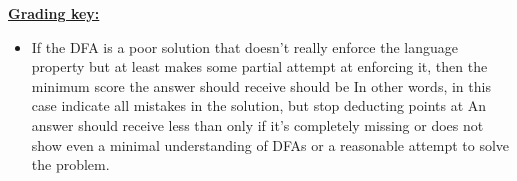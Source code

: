 \documentclass[11pt,fleqn]{article}
\begin{document}
\begin{enumerate}
\begin{info}{\textbf{\underline{Grading key:}}}
\begin{itemize}

              \item If the DFA is a poor solution that doesn't really
                    enforce the language property but at least makes some
                    partial attempt at enforcing it, then the
                    minimum score the answer should receive should be
                     In other words, in this case indicate all
                    mistakes in the solution, but stop deducting points at
                     An answer should receive less than 
                    only if it's completely missing or does not show even a
                    minimal understanding of DFAs or a reasonable attempt to
                    solve the problem.

            \end{itemize}


\end{info}
\end{enumerate}
\end{document}
